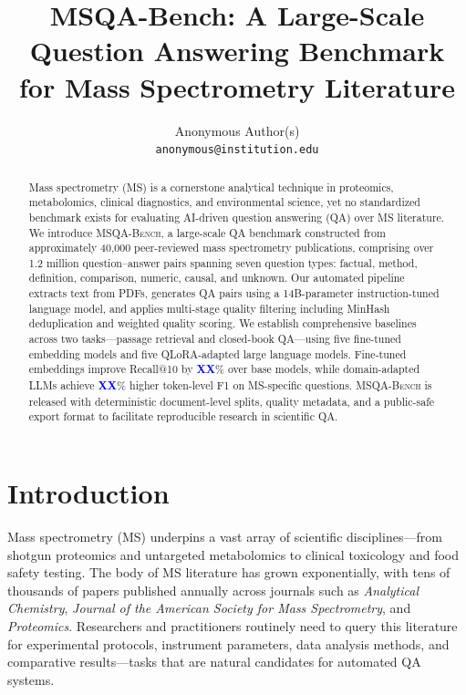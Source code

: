 \documentclass[11pt]{article}
\title{MSQA-Bench: A Large-Scale Question Answering Benchmark \\for Mass Spectrometry Literature}
\author{
  Anonymous Author(s) \\
  \texttt{anonymous@institution.edu}
}
\date{}
\newcommand{\msqa}{\textsc{MSQA-Bench}}
\newcommand{\placeholder}[1]{\textcolor{blue}{\textbf{#1}}}
\begin{document}
\maketitle

\begin{abstract}
Mass spectrometry (MS) is a cornerstone analytical technique in proteomics, metabolomics, clinical diagnostics, and environmental science, yet no standardized benchmark exists for evaluating AI-driven question answering (QA) over MS literature.
We introduce \msqa{}, a large-scale QA benchmark constructed from approximately 40,000 peer-reviewed mass spectrometry publications, comprising over 1.2 million question--answer pairs spanning seven question types: factual, method, definition, comparison, numeric, causal, and unknown.
Our automated pipeline extracts text from PDFs, generates QA pairs using a 14B-parameter instruction-tuned language model, and applies multi-stage quality filtering including MinHash deduplication and weighted quality scoring.
We establish comprehensive baselines across two tasks---passage retrieval and closed-book QA---using five fine-tuned embedding models and five QLoRA-adapted large language models.
Fine-tuned embeddings improve Recall@10 by \placeholder{XX}\% over base models, while domain-adapted LLMs achieve \placeholder{XX}\% higher token-level F1 on MS-specific questions.
\msqa{} is released with deterministic document-level splits, quality metadata, and a public-safe export format to facilitate reproducible research in scientific QA.
\end{abstract}

\section{Introduction}
\label{sec:introduction}

Mass spectrometry (MS) underpins a vast array of scientific disciplines---from shotgun proteomics and untargeted metabolomics to clinical toxicology and food safety testing. The body of MS literature has grown exponentially, with tens of thousands of papers published annually across journals such as \textit{Analytical Chemistry}, \textit{Journal of the American Society for Mass Spectrometry}, and \textit{Proteomics}. Researchers and practitioners routinely need to query this literature for experimental protocols, instrument parameters, data analysis methods, and comparative results---tasks that are natural candidates for automated QA systems.
\end{document}
